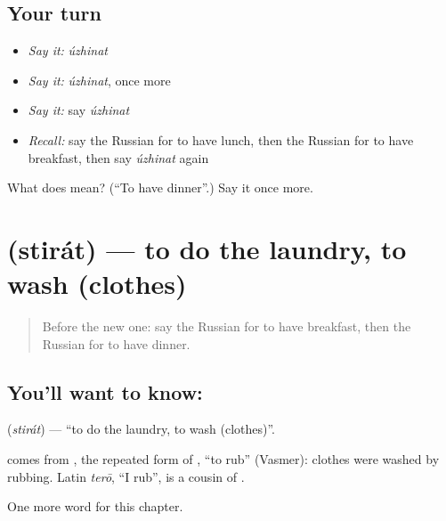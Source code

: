 \subsection*{Your turn}
\begin{itemize}
\raggedright
  \item \emph{Say it:} \emph{úzhinat}
  \item \emph{Say it:} \emph{úzhinat}, once more
  \item \emph{Say it:} say \emph{úzhinat}
  \item \emph{Recall:} say the Russian for to have lunch, then the Russian for to have breakfast, then say \emph{úzhinat} again
\end{itemize}

\begin{tcolorbox}[breakable,colback=teal!4,colframe=teal!35!black,title={Before you move on}]
What does  mean? (\textquotedblleft{}To have dinner\textquotedblright{}.) Say it once more.
\end{tcolorbox}
\section[\texorpdfstring{\ru{стирать} (stirát)}{стирать (stirát)}]{ (stirát) — to do the laundry, to wash (clothes)}

\label{lesson:RU-C140-stirat}



\begin{quote}
Before the new one: say the Russian for to have breakfast, then the Russian for to have dinner.
\end{quote}

\subsection*{You'll want to know: }
\textbf{} (\emph{stirát}) — \textquotedblleft{}to do the laundry, to wash (clothes)\textquotedblright{}.

\begin{cousinweb}
\textbf{} comes from \emph{}, the repeated form of \emph{}, \textquotedblleft{}to rub\textquotedblright{} (Vasmer): clothes were washed by rubbing. Latin \emph{terō}, \textquotedblleft{}I rub\textquotedblright{}, is a cousin of \emph{}.
\end{cousinweb}

\begin{grammarlens}[title={What you've built}]
One more word for this chapter.
\end{grammarlens}

